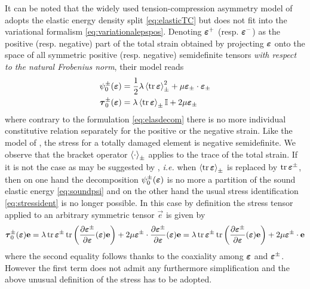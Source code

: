 It can be noted that the widely used tension-compression asymmetry model of \cite{MieheHofackerWelschinger:2010} adopts the elastic energy density split \eqref{eq:elasticTC} but does not fit into the variational formalism \eqref{eq:variationalepspos}. Denoting $\eps^+$ (resp. $\eps^-$) as the positive (resp. negative) part of the total strain obtained by projecting $\eps$ onto the space of all symmetric positive (resp. negative) semidefinite tensors \emph{with respect to the natural Frobenius norm}, their model reads
\begin{equation} \label{eq:miehe}
\begin{aligned}
\psi_0^\pm(\eps) &= \frac{1}{2}\lambda\inp{\tr\eps}_\pm^2+\mu\eps_\pm\cdot\eps_\pm \\
\vtau_0^\pm(\eps) &= \lambda\inp{\tr\eps}_\pm\mathbb{I}+2\mu\eps_\pm
\end{aligned}
\end{equation}
where contrary to the formulation \eqref{eq:elasdecom} there is no more individual constitutive relation separately for the positive or the negative strain. Like the model of \cite{FreddiRoyer-Carfagni:2010}, the stress for a totally damaged element is negative semidefinite. We observe that the bracket operator $\Braket{\cdot}_\pm$ applies to the trace of the total strain. If it is not the case as may be suggested by \cite{DallyWeinberg:2015,MayVignolletBorst:2015}, \emph{i.e.} when $\inp{\tr\eps}_\pm$ is replaced by $\tr\eps^\pm$, then on one hand the decomposition $\psi_0^\pm(\eps)$ is no more a partition of the sound elastic energy \eqref{eq:soundpsi} and on the other hand the usual stress identification \eqref{eq:stressident} is no longer possible. In this case by definition the stress tensor applied to an arbitrary symmetric tensor $\vec{e}$ is given by
\begin{equation}
\vtau_0^\pm(\eps)\vec{e}=\lambda\tr\eps^\pm\tr\left(\frac{\partial\eps^\pm}{\partial\eps}(\eps)\vec{e}\right)+2\mu\eps^\pm\cdot\frac{\partial\eps^\pm}{\partial\eps}(\eps)\vec{e}=\lambda\tr\eps^\pm\tr\left(\frac{\partial\eps^\pm}{\partial\eps}(\eps)\vec{e}\right)+2\mu\eps^\pm\cdot\vec{e}
\end{equation}
where the second equality follows thanks to the coaxiality among $\eps$ and $\eps^\pm$. However the first term does not admit any furthermore simplification and the above unusual definition of the stress has to be adopted.

